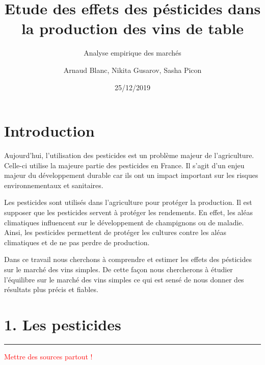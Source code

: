 \documentclass[11pt,]{article}
\title{Etude des effets des pésticides dans la production des vins de table}
\subtitle{Analyse empirique des marchés}
\author{Arnaud Blanc, Nikita Gusarov, Sasha Picon}
\date{25/12/2019}
\begin{document}
\maketitle


\hypersetup{linkcolor = black}

\tableofcontents





\newpage

\hypersetup{linkcolor = blue}

\hypertarget{introduction}{%
\section{Introduction}\label{introduction}}

Aujourd'hui, l'utilisation des pesticides est un problème majeur de
l'agriculture.\\
Celle-ci utilise la majeure partie des pesticides en France. Il s'agit
d'un enjeu majeur du développement durable car ils ont un impact
important sur les risques environnementaux et sanitaires.

Les pesticides sont utilisés dans l'agriculture pour protéger la
production. Il est supposer que les pesticides servent à protéger les
rendements. En effet, les aléas climatiques influencent sur le
développement de champignons ou de maladie. Ainsi, les pesticides
permettent de protéger les cultures contre les aléas climatiques et de
ne pas perdre de production.

Dans ce travail nous cherchons à comprendre et estimer les effets des
pésticides sur le marché des vins simples. De cette façon nous
chercherons à étudier l'équilibre sur le marché des vins simples ce qui
est sensé de nous donner des résultats plus précis et fiables.

\hypertarget{les-pesticides}{%
\section{1. Les pesticides}\label{les-pesticides}}

\noindent

\rule[0.5ex]{\linewidth}{1pt}

\textcolor{red}{Mettre des sources partout !}
\end{document}
